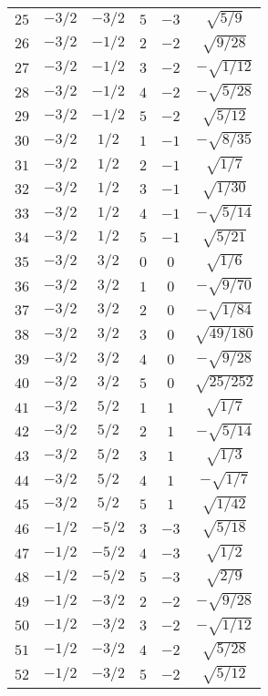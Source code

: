 \begin{table}
\begin{center}
\begin{tabular}{|c|c|c|c|c|c|}
$25$ & $-3/2$ & $-3/2$ & $5$ & $-3$ & $\sqrt{5/9}$ \\ 
$26$ & $-3/2$ & $-1/2$ & $2$ & $-2$ & $\sqrt{9/28}$ \\ 
$27$ & $-3/2$ & $-1/2$ & $3$ & $-2$ & $-\sqrt{1/12}$ \\ 
$28$ & $-3/2$ & $-1/2$ & $4$ & $-2$ & $-\sqrt{5/28}$ \\ 
$29$ & $-3/2$ & $-1/2$ & $5$ & $-2$ & $\sqrt{5/12}$ \\ 
$30$ & $-3/2$ & $1/2$ & $1$ & $-1$ & $-\sqrt{8/35}$ \\ 
$31$ & $-3/2$ & $1/2$ & $2$ & $-1$ & $\sqrt{1/7}$ \\ 
$32$ & $-3/2$ & $1/2$ & $3$ & $-1$ & $\sqrt{1/30}$ \\ 
$33$ & $-3/2$ & $1/2$ & $4$ & $-1$ & $-\sqrt{5/14}$ \\ 
$34$ & $-3/2$ & $1/2$ & $5$ & $-1$ & $\sqrt{5/21}$ \\ 
$35$ & $-3/2$ & $3/2$ & $0$ & $0$ & $\sqrt{1/6}$ \\ 
$36$ & $-3/2$ & $3/2$ & $1$ & $0$ & $-\sqrt{9/70}$ \\ 
$37$ & $-3/2$ & $3/2$ & $2$ & $0$ & $-\sqrt{1/84}$ \\ 
$38$ & $-3/2$ & $3/2$ & $3$ & $0$ & $\sqrt{49/180}$ \\ 
$39$ & $-3/2$ & $3/2$ & $4$ & $0$ & $-\sqrt{9/28}$ \\ 
$40$ & $-3/2$ & $3/2$ & $5$ & $0$ & $\sqrt{25/252}$ \\ 
$41$ & $-3/2$ & $5/2$ & $1$ & $1$ & $\sqrt{1/7}$ \\ 
$42$ & $-3/2$ & $5/2$ & $2$ & $1$ & $-\sqrt{5/14}$ \\ 
$43$ & $-3/2$ & $5/2$ & $3$ & $1$ & $\sqrt{1/3}$ \\ 
$44$ & $-3/2$ & $5/2$ & $4$ & $1$ & $-\sqrt{1/7}$ \\ 
$45$ & $-3/2$ & $5/2$ & $5$ & $1$ & $\sqrt{1/42}$ \\ 
$46$ & $-1/2$ & $-5/2$ & $3$ & $-3$ & $\sqrt{5/18}$ \\ 
$47$ & $-1/2$ & $-5/2$ & $4$ & $-3$ & $\sqrt{1/2}$ \\ 
$48$ & $-1/2$ & $-5/2$ & $5$ & $-3$ & $\sqrt{2/9}$ \\ 
$49$ & $-1/2$ & $-3/2$ & $2$ & $-2$ & $-\sqrt{9/28}$ \\ 
$50$ & $-1/2$ & $-3/2$ & $3$ & $-2$ & $-\sqrt{1/12}$ \\ 
$51$ & $-1/2$ & $-3/2$ & $4$ & $-2$ & $\sqrt{5/28}$ \\ 
$52$ & $-1/2$ & $-3/2$ & $5$ & $-2$ & $\sqrt{5/12}$ \\ 

\end{tabular}
\end{center}
\end{table}

